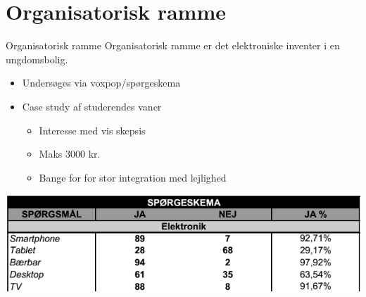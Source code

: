 \section{Organisatorisk ramme}
\begin{frame}{Organisatorisk ramme}{}
Organisatorisk ramme er det elektroniske inventer i en ungdomsbolig.
\begin{itemize}
\item Undersøges via voxpop/spørgeskema
\item Case study af studerendes vaner
\begin{itemize}
\item Interesse med vis skepsis
\item Maks 3000 kr.
\item Bange for for stor integration med lejlighed
\end{itemize}
\end{itemize}
\includegraphics[scale=0.5]{contens/spgskema.png}
\end{frame}
